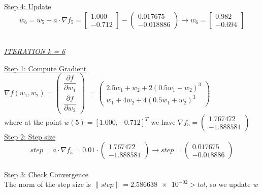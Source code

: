 \underline{Step 4: Update}
\[ 
w_6 = w_5 - a\cdot \nabla f_5 =  \left[\begin{array}{c}
	1.000\\
	-0.712
\end{array}\right] - \left(\begin{array}{c}
0.017675 \\
-0.018886
\end{array}\right) \rightarrow
w_6 = \left[\begin{array}{c}
	0.982\\
	-0.694
\end{array}\right]
\]
\\[4mm]

\begin{center}
	\underline{\textit{ITERATION k = 6}}
\end{center}

\underline{Step 1: Compute Gradient}\\
\(\nabla f(w_1,w_2) = \left(\begin{array}{c}
	\dfrac{\partial f}{\partial w_1} \\[4mm]
	\dfrac{\partial f}{\partial w_2}
\end{array}\right)\) $= \left(\begin{array}{c}
	2.5w_1 + w_2 + 2(0.5w_1+w_2)^3\\[1mm]
	w_1 + 4w_2 + 4(0.5w_1+w_2)^3
\end{array}\right)$ \\[3mm]

where at the point $w\left(5\right) = \left[1.000, -0.712\right]^T$ we have $\nabla f_{5} = \left(\begin{array}{c}
	1.767472 \\
	-1.888581
\end{array}\right)$
\\[4mm]

\underline{Step 2: Step size}
\[
step = a \cdot \nabla f_{5} = 0.01 \cdot \left(\begin{array}{c}
	1.767472 \\
	-1.888581
\end{array}\right) \rightarrow step =\left(\begin{array}{c}
	0.017675 \\
	-0.018886
\end{array}\right)
\]
\\[4mm]

\underline{Step 3: Check Convergence}\\
The norm of the step size is $\| step \| = \num{2.586638e-02} > tol$, so we update $w$
\\[4mm]

